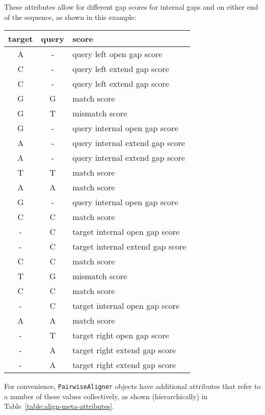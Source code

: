 These attributes allow for different gap scores for internal gaps and on either end of the sequence, as shown in this example:

\begin{table}[h]
\begin{tabular}{|c|c|l|}
\hline
\bf{target} & \bf{query} & \bf{score} \\
\hline
A & - &  query left open gap score \\
C & - &  query left extend gap score \\
C & - &  query left extend gap score \\
G & G &  match score \\
G & T &  mismatch score \\
G & - &  query internal open gap score \\
A & - &  query internal extend gap score \\
A & - &  query internal extend gap score \\
T & T &  match score \\
A & A &  match score \\
G & - &  query internal open gap score \\
C & C &  match score \\
- & C &  target internal open gap score \\
- & C &  target internal extend gap score \\
C & C &  match score \\
T & G &  mismatch score \\
C & C &  match score \\
- & C &  target internal open gap score \\
A & A &  match score \\
- & T &  target right open gap score \\
- & A &  target right extend gap score \\
- & A &  target right extend gap score \\
\hline
\end{tabular}
\end{table}

For convenience, \verb+PairwiseAligner+ objects have additional attributes that refer to a number of these values collectively, as shown (hierarchically) in Table~\ref{table:align-meta-attributes}.

